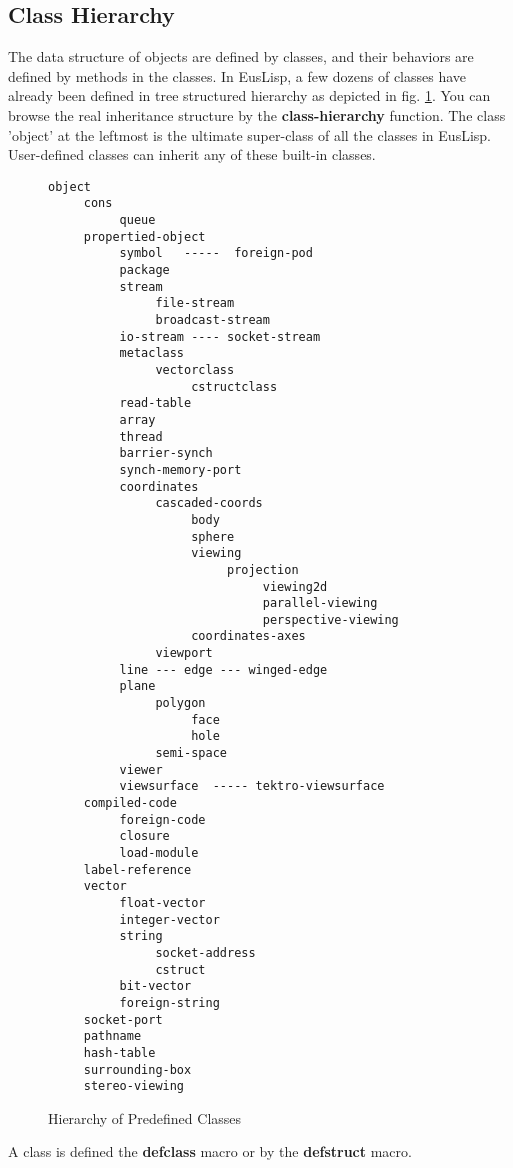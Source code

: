 \subsection{Class Hierarchy}

The data structure of objects are defined by classes,
and their behaviors are defined by methods in the classes.
In EusLisp, a few dozens of classes have already been 
defined in tree structured
hierarchy as depicted in fig. \ref{ClassHierarchy}.
You can browse the real inheritance structure by the 
{\bf class-hierarchy} function.
The class 'object' at the leftmost is the ultimate super-class of
all the classes in EusLisp.
User-defined classes can inherit any of these built-in classes.

\begin{figure}
\small
\begin{verbatim}
object
     cons
          queue
     propertied-object
          symbol   -----  foreign-pod
          package
          stream
               file-stream
               broadcast-stream
          io-stream ---- socket-stream
          metaclass
               vectorclass
                    cstructclass
          read-table
          array
          thread
          barrier-synch
          synch-memory-port
          coordinates
               cascaded-coords
                    body
                    sphere
                    viewing
                         projection
                              viewing2d
                              parallel-viewing
                              perspective-viewing
                    coordinates-axes
               viewport
          line --- edge --- winged-edge
          plane
               polygon
                    face
                    hole
               semi-space
          viewer
          viewsurface  ----- tektro-viewsurface
     compiled-code
          foreign-code
          closure
          load-module
     label-reference
     vector
          float-vector
          integer-vector
          string
               socket-address
               cstruct
          bit-vector
          foreign-string
     socket-port
     pathname
     hash-table
     surrounding-box
     stereo-viewing
\end{verbatim}
\normalsize
\caption{\label{ClassHierarchy}Hierarchy of Predefined Classes}
\end{figure}

A class is defined the {\bf defclass} macro or by the {\bf defstruct} macro.

